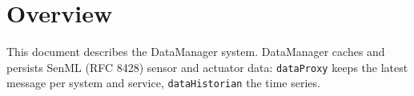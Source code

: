 \documentclass[a4paper]{arrowhead}
\begin{document}
\sloppy

\ArrowheadSetup

\begin{center}
  \vspace*{1cm}
  \huge{\arrowtitle}

  \vspace*{0.2cm}
  \LARGE{\arrowtype}
  \vspace*{1cm}

  \vspace*{\fill}


  \vspace*{1cm}
  \vspace*{\fill}

  \begin{abstract}
    This document describes the DataManager support system of the Eclipse Arrowhead 5.2.2 framework, as implemented in \texttt{ah5-DataManager-java-spring} of the primary Java source tree (\texttt{Eclipse-Arrowhead-java}) and deployed with the standalone Compose definition of that folder.
  \end{abstract}

  \vspace*{1cm}
\end{center}

\newpage

\tableofcontents
\newpage

\section{Overview}
\label{sec:overview}

This document describes the DataManager system. DataManager caches and persists SenML (RFC 8428) sensor and actuator data: \texttt{dataProxy} keeps the latest message per system and service, \texttt{dataHistorian} the time series.
\end{document}
